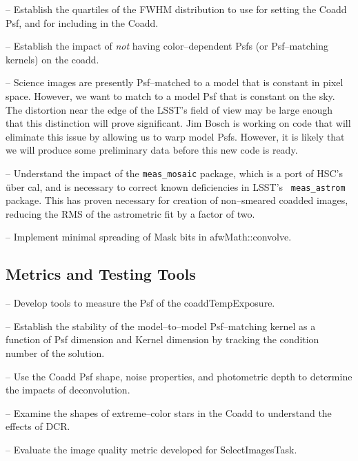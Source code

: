 \documentclass[12pt]{article}
\begin{document}
-- Establish the quartiles of the FWHM distribution to use for setting the Coadd Psf, 
and for including in the Coadd.

-- Establish the impact of {\it not} having color--dependent Psfs (or Psf--matching kernels) on the coadd.

-- Science images are presently Psf--matched to a model that is constant in pixel space.
However, we want to match to a model Psf that is constant on the sky.  The
distortion near the edge of the LSST's field of view may be large enough
that this distinction will prove significant. Jim Bosch is working on code
that will eliminate this issue by allowing us to warp model Psfs.
However, it is likely that we will produce some preliminary data before this new code is ready.

-- Understand the impact of the {\tt meas\_mosaic} package, which is a port of HSC's \"{u}ber
cal, and is necessary to correct known deficiencies in LSST's {\tt
  meas\_astrom} package.  This has proven necessary for creation of
non--smeared coadded images, reducing the RMS of the astrometric fit
by a factor of two.  

-- Implement minimal spreading of Mask bits in afwMath::convolve.

%
%
%
%
%

\subsection{Metrics and Testing Tools}

-- Develop tools to measure the Psf of the coaddTempExposure.

-- Establish the stability of the model--to--model Psf--matching
kernel as a function of Psf dimension and Kernel dimension by tracking
the condition number of the solution.

-- Use the Coadd Psf shape, noise properties, and photometric depth 
to determine the impacts of deconvolution.

-- Examine the shapes of extreme--color stars in the Coadd to understand the effects of DCR.

-- Evaluate the image quality metric developed for SelectImagesTask.

\end{document}
